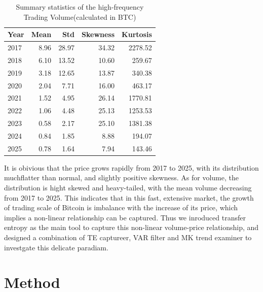 \documentclass{elsarticle}
\begin{document}
\begin{table}[H]
  \caption{Summary statistics of the high-frequency Trading Volume(calculated in BTC)}
  \label{tab:volume_stats}
  \centering
  \begin{tabular}{lrrrr}
    \hline\noalign{\smallskip}
    \textbf{Year} & \textbf{Mean} & \textbf{Std} & \textbf{Skewness} & \textbf{Kurtosis} \\
    \hline\noalign{\smallskip}
    2017 & 8.96  & 28.97  & 34.32  & 2278.52 \\
    2018 & 6.10  & 13.52  & 10.60  & 259.67 \\
    2019 & 3.18  & 12.65  & 13.87  & 340.38 \\
    2020 & 2.04  & 7.71   & 16.00  & 463.17 \\
    2021 & 1.52  & 4.95   & 26.14  & 1770.81 \\
    2022 & 1.06  & 4.48   & 25.13  & 1253.53 \\
    2023 & 0.58  & 2.17   & 25.10  & 1381.38 \\
    2024 & 0.84  & 1.85   & 8.88   & 194.07 \\
    2025 & 0.78  & 1.64   & 7.94   & 143.46 \\
    \hline
  \end{tabular}
\end{table}
It is obivious that the price grows rapidly from 2017 to 2025, with its distribution muchflatter than normal, and slightly positive skewness. As for volume, the distribution is hight skewed and heavy-tailed, with the mean volume decreasing from 2017 to 2025. This indicates that in this fast, extensive market, the growth of trading scale of Bitcoin is imbalance with the increase of its price, which implies a non-linear relationship can be captured. Thus we inroduced transfer entropy as the main tool to capture this non-linear volume-price relationship, and designed a combination of TE captureer, VAR filter and MK trend examiner to investgate this delicate paradiam.

\section{Method}\label{sec:method}
\end{document}
